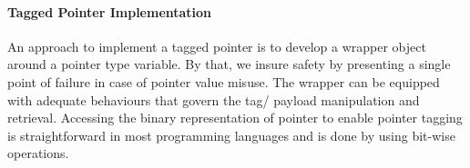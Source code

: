 \paragraph{Tagged Pointer Implementation}

An approach to implement a tagged pointer is to develop a wrapper object around a pointer type variable. By that, we insure safety by presenting a single point of failure in case of pointer value misuse. The wrapper can be equipped with adequate behaviours that govern the tag/ payload manipulation and retrieval. Accessing the binary representation of pointer to enable pointer tagging is straightforward in most programming languages and is done by using bit-wise operations. \\


\clearpage